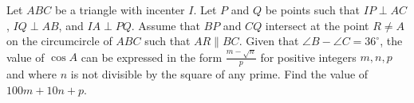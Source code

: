 Let $ABC$ be a triangle with incenter $I$. Let $P$ and $Q$ be points such that $IP\perp AC$, $IQ\perp AB$, and $IA\perp PQ$. Assume that $BP$ and $CQ$ intersect at the point $R\neq A$ on the circumcircle of $ABC$ such that $AR\parallel BC$. Given that $\angle B-\angle C=36^\circ$, the value of $\cos A$ can be expressed in the form $\frac{m-\sqrt n}{p}$ for positive integers $m,n,p$ and where $n$ is not divisible by the square of any prime. Find the value of $100m+10n+p$.
